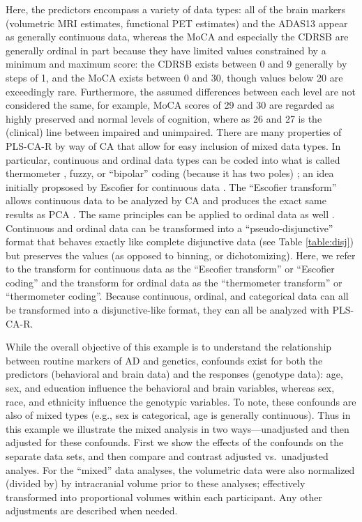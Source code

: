 \documentclass[12pt]{article}
\begin{document}
Here, the predictors encompass a variety of data types: all of the brain
markers (volumetric MRI estimates, functional PET estimates) and the
ADAS13 appear as generally continuous data, whereas the MoCA and
especially the CDRSB are generally ordinal in part because they have
limited values constrained by a minimum and maximum score: the CDRSB
exists between 0 and 9 generally by steps of 1, and the MoCA exists
between 0 and 30, though values below 20 are exceedingly rare.
Furthermore, the assumed differences between each level are not
considered the same, for example, MoCA scores of 29 and 30 are regarded
as highly preserved and normal levels of cognition, where as 26 and 27
is the (clinical) line between impaired and unimpaired. There are many
properties of PLS-CA-R by way of CA that allow for easy inclusion of
mixed data types. In particular, continuous and ordinal data types can
be coded into what is called thermometer
\citep{beaton2018generalization}, fuzzy, or ``bipolar'' coding (because
it has two poles) \citep{greenacrefuzzy}; an idea initially propsosed by
Escofier for continuous data \citep{escofier_traitement_1979}. The
``Escofier transform'' allows continuous data to be analyzed by CA and
produces the exact same results as PCA \citep{escofier_traitement_1979}.
The same principles can be applied to ordinal data as well
\citep{beaton2018generalization}. Continuous and ordinal data can be
transformed into a ``pseudo-disjunctive'' format that behaves exactly
like complete disjunctive data (see Table \ref{table:disj}) but
preserves the values (as opposed to binning, or dichotomizing). Here, we
refer to the transform for continuous data as the ``Escofier transform''
or ``Escofier coding'' \citep{beaton_partial_2016} and the transform for
ordinal data as the ``thermometer transform'' or ``thermometer coding''.
Because continuous, ordinal, and categorical data can all be transformed
into a disjunctive-like format, they can all be analyzed with PLS-CA-R.

While the overall objective of this example is to understand the
relationship between routine markers of AD and genetics, confounds exist
for both the predictors (behavioral and brain data) and the responses
(genotype data): age, sex, and education influence the behavioral and
brain variables, whereas sex, race, and ethnicity influence the
genotypic variables. To note, these confounds are also of mixed types
(e.g., sex is categorical, age is generally continuous). Thus in this
example we illustrate the mixed analysis in two ways---unadjusted and
then adjusted for these confounds. First we show the effects of the
confounds on the separate data sets, and then compare and contrast
adjusted vs.~unadjusted analyes. For the ``mixed'' data analyses, the
volumetric data were also normalized (divided by) by intracranial volume
prior to these analyses; effectively transformed into proportional
volumes within each participant. Any other adjustments are described
when needed.
\end{document}
